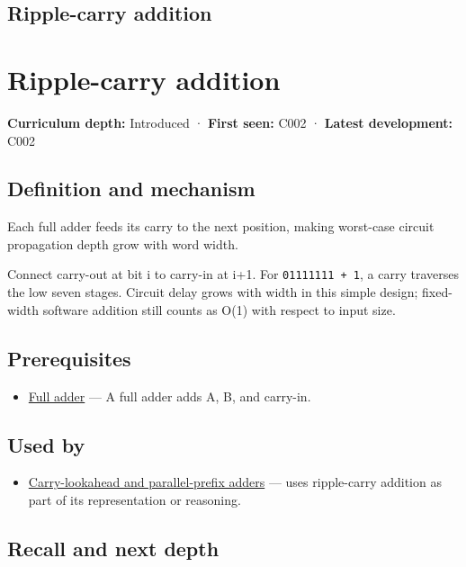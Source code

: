 \hypertarget{appendix-17917d9fdbe3}{}
\section*{Ripple-carry addition}
\chapter{Ripple-carry addition}\label{appendix-17917d9fdbe3-ripple-carry-addition}

\textbf{Curriculum depth:} Introduced · \textbf{First seen:} C002 · \textbf{Latest development:} C002

\section{Definition and mechanism}\label{appendix-17917d9fdbe3-definition-and-mechanism}

Each full adder feeds its carry to the next position, making worst-case circuit propagation depth grow with word width.

Connect carry-out at bit i to carry-in at i+1. For \texttt{01111111\ +\ 1}, a carry traverses the low seven stages. Circuit delay grows with width in this simple design; fixed-width software addition still counts as O(1) with respect to input size.

\section{Prerequisites}\label{appendix-17917d9fdbe3-prerequisites}

\begin{itemize}
\tightlist
\item
  \hyperref[appendix-d1a5b1e520c2]{Full adder} --- A full adder adds A, B, and carry-in.
\end{itemize}

\section{Used by}\label{appendix-17917d9fdbe3-used-by}

\begin{itemize}
\tightlist
\item
  \hyperref[appendix-b5c46b2d94ff]{Carry-lookahead and parallel-prefix adders} --- uses ripple-carry addition as part of its representation or reasoning.
\end{itemize}

\section{Recall and next depth}\label{appendix-17917d9fdbe3-recall-and-next-depth}

